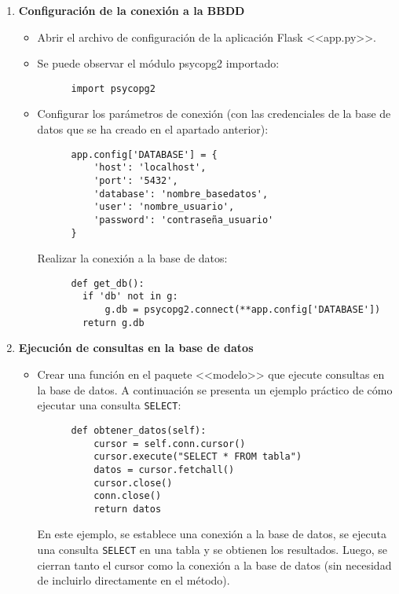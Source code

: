 \begin{enumerate}

  \item \textbf{Configuración de la conexión a la BBDD}

  \begin{itemize}
    \item Abrir el archivo de configuración de la aplicación Flask <<app.py>>.
    \item Se puede observar el módulo psycopg2 importado:
      \begin{verbatim}
      import psycopg2
      \end{verbatim}
    \item Configurar los parámetros de conexión (con las credenciales de la base de datos que se ha creado en el apartado anterior):
      \begin{verbatim}
      app.config['DATABASE'] = {
          'host': 'localhost',
          'port': '5432',
          'database': 'nombre_basedatos',
          'user': 'nombre_usuario',
          'password': 'contraseña_usuario'
      }
      \end{verbatim}
    Realizar la conexión a la base de datos:
      \begin{verbatim}
      def get_db():
        if 'db' not in g:
            g.db = psycopg2.connect(**app.config['DATABASE'])
        return g.db
      \end{verbatim}
  \end{itemize}

  \item \textbf{Ejecución de consultas en la base de datos}

  \begin{itemize}

    \item Crear una función en el paquete <<modelo>> que ejecute consultas en la base de datos. A continuación se presenta un ejemplo práctico de cómo ejecutar una consulta \texttt{SELECT}:
      \begin{verbatim}
      def obtener_datos(self):
          cursor = self.conn.cursor()
          cursor.execute("SELECT * FROM tabla")
          datos = cursor.fetchall()
          cursor.close()
          conn.close()
          return datos
      \end{verbatim}
      En este ejemplo, se establece una conexión a la base de datos, se ejecuta una consulta \texttt{SELECT} en una tabla y se obtienen los resultados. Luego, se cierran tanto el cursor como la conexión a la base de datos (sin necesidad de incluirlo directamente en el método).

  \end{itemize}
\end{enumerate}


